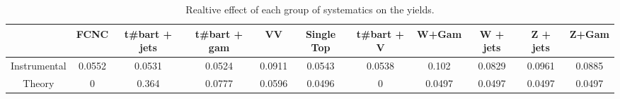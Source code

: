 \begin{table}[htbp]
\begin{center}
\begin{tabular}{|c|c|c|c|c|c|c|c|c|c|c|}
\hline 
      & FCNC      & t#bar{t} + jets      & t#bar{t} +  gam      & VV      & Single Top      & t#bar{t} + V      & W+Gam      & W + jets      & Z + jets      & Z+Gam \\ 
\hline 
 Instrumental & 0.0552 & 0.0531 & 0.0524 & 0.0911 & 0.0543 & 0.0538 & 0.102 & 0.0829 & 0.0961 & 0.0885 \\ 
 Theory & 0 & 0.364 & 0.0777 & 0.0596 & 0.0496 & 0 & 0.0497 & 0.0497 & 0.0497 & 0.0497 \\ 
\hline 
\end{tabular} 
\caption{Realtive effect of each group of systematics on the yields.} 
\end{center} 
\end{table} 
